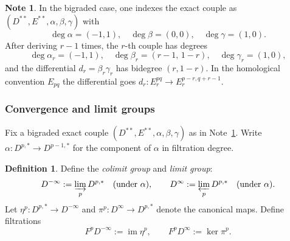 \documentclass[12pt,a4paper]{article}
\theoremstyle{definition}
\newtheorem{definition}[theorem]{Definition}
\newtheorem{note}[theorem]{Note}
\begin{document}
\begin{note}\label{note:bigraded-couple}
In the bigraded case, one indexes the exact couple as
$(D^{**},E^{**},\alpha,\beta,\gamma)$ with
\[
  \deg\alpha = (-1,1),\quad \deg\beta = (0,0),\quad \deg\gamma = (1,0).
\]
After deriving $r-1$ times, the $r$-th couple has degrees
\[
  \deg\alpha_r = (-1,1),\quad
  \deg\beta_r = (r-1,\,1-r),\quad
  \deg\gamma_r = (1,0),
\]
and the differential $d_r=\beta_r\gamma_r$ has bidegree $(r,1-r)$.  In the
homological convention $E_{pq}$ the differential goes
$d_r:E_r^{pq}\to E_r^{p-r,q+r-1}$.
\end{note}

\subsubsection{Convergence and limit groups}

Fix a bigraded exact couple $(D^{**},E^{**},\alpha,\beta,\gamma)$ as in
Note~\ref{note:bigraded-couple}.  Write $\alpha:D^{p,*}\to D^{p-1,*}$ for the
component of $\alpha$ in filtration degree.

\begin{definition}\label{def:limit-groups}
Define the \emph{colimit group} and \emph{limit group}:
\[
  D^{-\infty} := \varinjlim_p D^{p,*}
  \quad\text{(under }\alpha\text{)},\qquad
  D^{\infty}  := \varprojlim_p D^{p,*}
  \quad\text{(under }\alpha\text{)}.
\]
Let $\eta^p:D^{p,*}\to D^{-\infty}$ and $\pi^p:D^\infty\to D^{p,*}$ denote the
canonical maps.  Define filtrations
\[
  F^p D^{-\infty} := \operatorname{im}\eta^p,\qquad
  F^p D^{\infty}  := \ker\pi^p.
\]
\end{definition}
\end{document}
